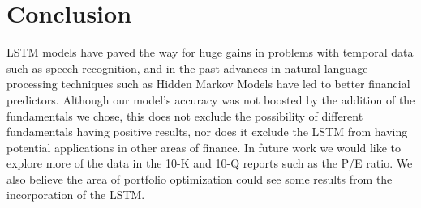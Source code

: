 \documentclass{article}
\begin{document}
\section{Conclusion}
\label{sec:conclusion}

LSTM models have paved the way for huge gains in problems with temporal data such as speech recognition, and in the past advances in natural language processing techniques such as Hidden Markov Models have led to better financial predictors. Although our model’s accuracy was not boosted by the addition of the fundamentals we chose, this does not exclude the possibility of different fundamentals having positive results, nor does it exclude the LSTM from having potential applications in other areas of finance. In future work we would like to explore more of the data in the 10-K and 10-Q reports such as the P/E ratio. We also believe the area of portfolio optimization could see some results from the incorporation of the LSTM. 


\nocite{maknickienė_maknickas}
\nocite{ding_zhang_liu_duan_2015}


\end{document}
